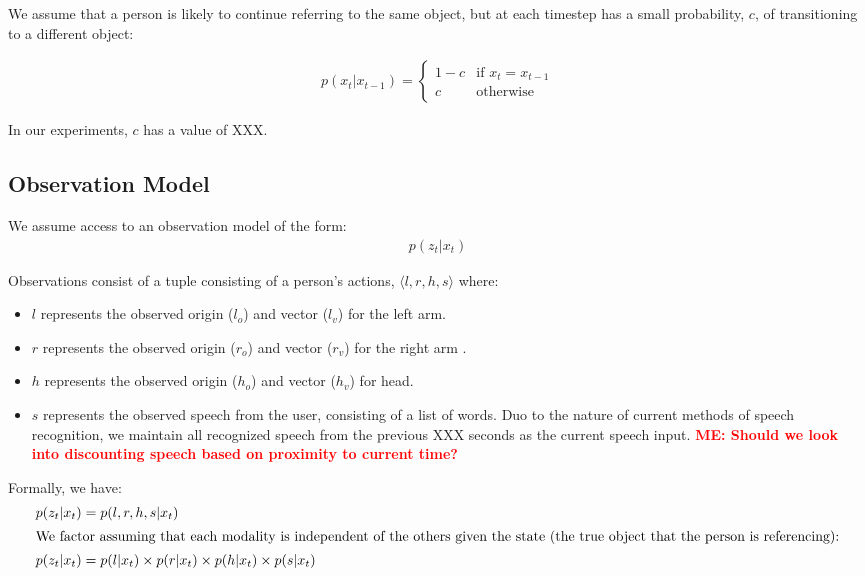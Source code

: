 \documentclass[letterpaper, 10 pt, conference]{ieeeconf}
\newcommand{\stnote}[1]{\textcolor{Blue}{\textbf{ST: #1}}}
\newcommand{\menote}[1]{\textcolor{Red}{\textbf{ME: #1}}}
\begin{document}
We assume that a person is likely to continue referring to the same
object, but at each timestep has a small probability, $c$, of
transitioning to a different object: 

\begin{align}
p(x_t | x_{t-1}) = \left\{  \begin{array}{ll}
1-c &\mbox{if } x_t = x_{t-1}\\
c &\mbox{otherwise}
\end{array}\right.
\end{align}

In our experiments, $c$ has a value of XXX.


\subsection{Observation Model}

We assume access to an observation model of the form:
\begin{align}
p(z_t | x_t)
\end{align}

Observations consist of a tuple consisting of a person's actions,
$\langle l, r, h, s\rangle $ where:
\begin{itemize}
	\item $l$ represents the observed origin ($l_o$) and vector ($l_v$) for the left arm.
	\item $r$ represents the observed origin  ($r_o$) and vector ($r_v$)  for the right arm .
	\item $h$ represents the observed origin  ($h_o$) and vector ($h_v$)  for head.
	\item $s$ represents the observed speech from the user,
          consisting of a list of words. Duo to the nature of current
          methods of speech recognition, we maintain all recognized
          speech from the previous XXX seconds as the current speech
          input. \menote{Should we look into discounting speech based
            on proximity to current time?}
	\end{itemize}

Formally, we have:
\begin{align}
p(z_t | x_t) &= p(l, r, h, s | x_t)\\
\intertext{We factor assuming that each modality is independent of the others given the state (the true object that the person is referencing):}
p(z_t | x_t) &= p(l | x_t) \times p(r | x_t) \times p(h | x_t) \times p(s | x_t)
\end{align}
\end{document}
